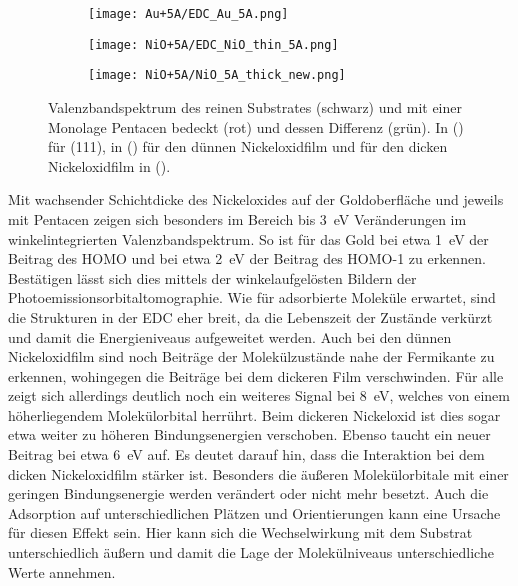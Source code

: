             \begin{figure}
                \centering
                \begin{subfigure}[t]{0.30\textwidth}
                    \centering
                    \texttt{[image: Au+5A/EDC\_Au\_5A.png]}
                    \subcaption{}
                    \label{fig:EDC_Au+5A}
                \end{subfigure}
                \begin{subfigure}[t]{0.30\textwidth}
                    \centering
                    \texttt{[image: NiO+5A/EDC\_NiO\_thin\_5A.png]}
                    \subcaption{}
                    \label{fig:EDC_NiO_thin+5A}
                \end{subfigure}
                \begin{subfigure}[t]{0.30\textwidth}
                    \centering
                    \texttt{[image: NiO+5A/NiO\_5A\_thick\_new.png]}
                    \subcaption{}
                    \label{fig:EDC_NiO+5A}
                \end{subfigure}
                \caption{Valenzbandspektrum des reinen Substrates (schwarz) und mit einer Monolage Pentacen bedeckt (rot) und dessen Differenz (grün).
                In () für (111), in () für den dünnen Nickeloxidfilm und für den dicken Nickeloxidfilm in ().}
            \end{figure}
            Mit wachsender Schichtdicke des Nickeloxides auf der Goldoberfläche und jeweils mit Pentacen zeigen sich besonders im Bereich bis \SI{3}{\electronvolt} Veränderungen im winkelintegrierten Valenzbandspektrum.
            So ist für das Gold bei etwa \SI{1}{\electronvolt} der Beitrag des HOMO und bei etwa \SI{2}{\electronvolt} der Beitrag des HOMO-1 zu erkennen.
            Bestätigen lässt sich dies mittels der winkelaufgelösten Bildern der Photoemissionsorbitaltomographie.
            Wie für adsorbierte Moleküle erwartet, sind die Strukturen in der EDC eher breit, da die Lebenszeit der Zustände verkürzt und damit die Energieniveaus aufgeweitet werden.
            Auch bei den dünnen Nickeloxidfilm sind noch Beiträge der Molekülzustände nahe der Fermikante zu erkennen, wohingegen die Beiträge bei dem dickeren Film verschwinden.
            Für alle zeigt sich allerdings deutlich noch ein weiteres Signal bei \SI{8}{\electronvolt}, welches von einem höherliegendem Molekülorbital herrührt.
            Beim dickeren Nickeloxid ist dies sogar etwa weiter zu höheren Bindungsenergien verschoben.
            Ebenso taucht ein neuer Beitrag bei etwa \SI{6}{\electronvolt} auf.
            Es deutet darauf hin, dass die Interaktion bei dem dicken Nickeloxidfilm stärker ist.
            Besonders die äußeren Molekülorbitale mit einer geringen Bindungsenergie werden verändert oder nicht mehr besetzt.
            Auch die Adsorption auf unterschiedlichen Plätzen und Orientierungen kann eine Ursache für diesen Effekt sein.
            Hier kann sich die Wechselwirkung mit dem Substrat unterschiedlich äußern und damit die Lage der Molekülniveaus unterschiedliche Werte annehmen.

